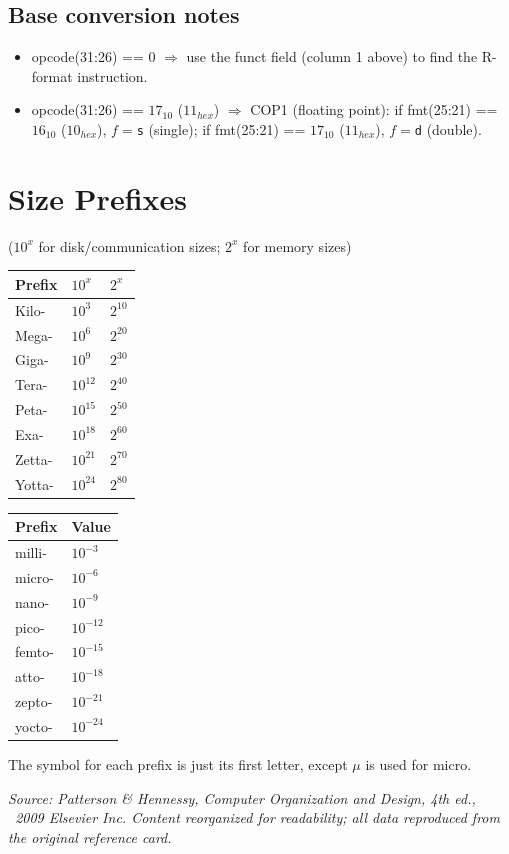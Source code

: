 \documentclass[10pt]{article}
\newcommand{\op}[1]{\texttt{#1}}
\begin{document}
\subsection{Base conversion notes}
\begin{itemize}
  \item opcode(31:26) == 0 $\Rightarrow$ use the funct field (column 1
  above) to find the R-format instruction.
  \item opcode(31:26) == $17_{10}$ ($11_{hex}$) $\Rightarrow$ COP1
  (floating point): if fmt(25:21) == $16_{10}$ ($10_{hex}$), $f=$\op{s}
  (single); if fmt(25:21) == $17_{10}$ ($11_{hex}$), $f=$\op{d} (double).
\end{itemize}

\section{Size Prefixes}
($10^x$ for disk/communication sizes; $2^x$ for memory sizes)

\begin{center}
\begin{tabular}{@{}lll@{}}
\toprule
Prefix & $10^x$ & $2^x$ \\
\midrule
Kilo-  & $10^3$  & $2^{10}$ \\
Mega-  & $10^6$  & $2^{20}$ \\
Giga-  & $10^9$  & $2^{30}$ \\
Tera-  & $10^{12}$ & $2^{40}$ \\
Peta-  & $10^{15}$ & $2^{50}$ \\
Exa-   & $10^{18}$ & $2^{60}$ \\
Zetta- & $10^{21}$ & $2^{70}$ \\
Yotta- & $10^{24}$ & $2^{80}$ \\
\bottomrule
\end{tabular}
\qquad
\begin{tabular}{@{}ll@{}}
\toprule
Prefix & Value \\
\midrule
milli-  & $10^{-3}$ \\
micro-  & $10^{-6}$ \\
nano-   & $10^{-9}$ \\
pico-   & $10^{-12}$ \\
femto-  & $10^{-15}$ \\
atto-   & $10^{-18}$ \\
zepto-  & $10^{-21}$ \\
yocto-  & $10^{-24}$ \\
\bottomrule
\end{tabular}
\end{center}
The symbol for each prefix is just its first letter, except $\mu$ is used
for micro.

\vfill
\noindent\emph{Source: Patterson \& Hennessy, \emph{Computer Organization
and Design}, 4th ed., \textcopyright\ 2009 Elsevier Inc. Content
reorganized for readability; all data reproduced from the original
reference card.}
\end{document}
